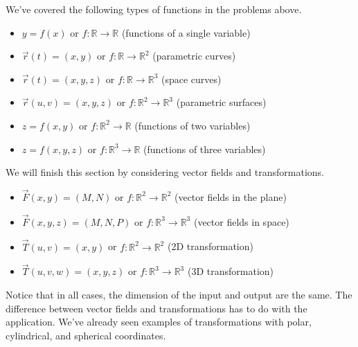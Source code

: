 We've covered the following types of functions in the problems above.
\begin{itemize}
 \item $y=f(x)$ or $f:\mathbb{R}\to\mathbb{R}$ (functions of a single variable)
 \item $\vec r(t)=(x,y)$ or $f:\mathbb{R}\to\mathbb{R}^2$ (parametric curves)
 \item $\vec r(t)=(x,y,z)$ or $f:\mathbb{R}\to\mathbb{R}^3$ (space curves)
 \item $\vec r(u,v)=(x,y,z)$ or $f:\mathbb{R}^2\to\mathbb{R}^3$ (parametric surfaces)
 \item $z=f(x,y)$ or $f:\mathbb{R}^2\to\mathbb{R}$ (functions of two variables)
 \item $z=f(x,y,z)$ or $f:\mathbb{R}^3\to\mathbb{R}$ (functions of three variables)
\end{itemize}
We will finish this section by considering vector fields and transformations. 
\begin{itemize}
 \item $\vec F(x,y)=(M,N)$ or $f:\mathbb{R}^2\to\mathbb{R}^2$ (vector fields in the plane)
 \item $\vec F(x,y,z)=(M,N,P)$ or $f:\mathbb{R}^3\to\mathbb{R}^3$ (vector fields in space)
 \item $\vec T(u,v)=(x,y)$ or $f:\mathbb{R}^2\to\mathbb{R}^2$ (2D transformation)
 \item $\vec T(u,v,w)=(x,y,z)$ or $f:\mathbb{R}^3\to\mathbb{R}^3$ (3D transformation)
\end{itemize}
Notice that in all cases, the dimension of the input and output are the same. The difference between vector fields and transformations has to do with the application. We've already seen examples of transformations with polar, cylindrical, and spherical coordinates.

